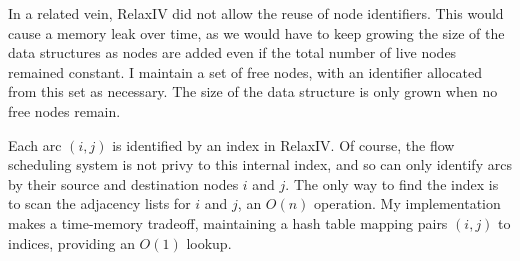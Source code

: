 In a related vein, RelaxIV did not allow the reuse of node identifiers. This would cause a memory leak over time, as we would have to keep growing the size of the data structures as nodes are added even if the total number of live nodes remained constant. I maintain a set of free nodes, with an identifier allocated from this set as necessary. The size of the data structure is only grown when no free nodes remain.

Each arc $(i,j)$ is identified by an index in RelaxIV. Of course, the flow scheduling system is not privy to this internal index, and so can only identify arcs by their source and destination nodes $i$ and $j$. The only way to find the index is to scan the adjacency lists for $i$ and $j$, an $O(n)$ operation. My implementation makes a time-memory tradeoff, maintaining a hash table mapping pairs $(i,j)$ to indices, providing an $O(1)$ lookup\footnotemark.

%
%
%
%
%
%
%
%
%
%
%

